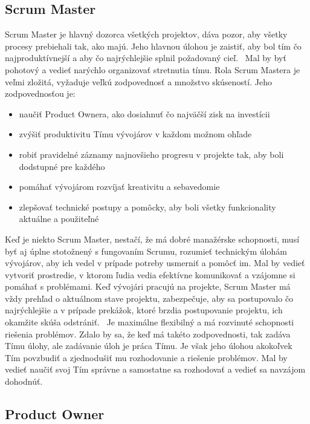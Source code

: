 \documentclass[10pt,slovak,a4paper]{article}
\begin{document}
\subsection{Scrum Master} \label{funkcie:master}

Scrum Master je hlavný dozorca všetkých projektov, dáva pozor, aby všetky procesy prebiehali tak, ako majú. Jeho hlavnou úlohou je zaistiť, aby bol tím čo najproduktívnejší a aby čo najrýchlejšie splnil požadovaný cieľ.~\cite{cprime} Mal by byť pohotový a vedieť narýchlo organizovať stretnutia tímu. Rola Scrum Mastera je veľmi zložitá, vyžaduje veľkú zodpovednosť a množstvo skúseností. 
Jeho zodpovednosťou je:

\begin{itemize}
\item naučiť Product Ownera, ako dosiahnuť čo najväčší zisk na investícii
\item zvýšiť produktivitu Tímu vývojárov v každom možnom ohľade
\item robiť pravidelné záznamy najnovšieho progresu v projekte tak, aby boli dodstupné pre každého
\item pomáhať vývojárom rozvíjať kreativitu a sebavedomie
\item zlepšovať technické postupy a pomôcky, aby boli všetky funkcionality aktuálne a použiteľné~\cite{cprime}
\end{itemize}

Keď je niekto Scrum Master, nestačí, že má dobré manažérske schopnosti, musí byť aj úplne stotožnený s fungovaním Scrumu, rozumieť technickým úlohám vývojárov, aby ich vedel v prípade potreby usmerniť a pomôcť im. Mal by vedieť vytvoriť prostredie, v ktorom ľudia vedia efektívne komunikovať a vzájomne si pomáhať s problémami. Keď vývojári pracujú na projekte, Scrum Master má vždy prehľad o aktuálnom stave projektu, zabezpečuje, aby sa postupovalo čo najrýchlejšie a v prípade prekážok, ktoré brzdia postupovanie projektu, ich okamžite skúša odstrániť.~\cite{cprime} Je maximálne flexibilný a má rozvinuté schopnosti riešenia problémov. Zdalo by sa, že keď má takéto zodpovednosti, tak zadáva Tímu úlohy, ale zadávanie úloh je práca Tímu. Je však jeho úlohou akokoľvek Tím povzbudiť a zjednodušiť mu rozhodovanie a riešenie problémov. Mal by vedieť naučiť svoj Tím správne a samostatne sa rozhodovať a vedieť sa navzájom dohodnúť.~\cite{cprime}


\subsection{Product Owner} \label{funkcie:owner}
\end{document}
